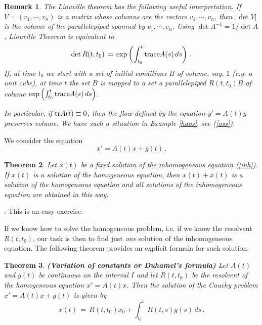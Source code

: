 \documentclass[12pt]{report}
\newcommand{\trace}{{\rm tr}}
\newtheorem{theorem}{Theorem}[section]
\newtheorem{remark}[theorem]{Remark}
\newcommand{\proof}{\noindent {\em Proof:~}}
\def\eqref#1{(\ref{#1})}
\def\qed{\hbox{\hskip 6pt\vrule width6pt height7pt depth1pt
    \hskip1pt}\bigskip}
\begin{document}
\begin{remark}{\rm The Liouville theorem has the following useful 
interpretation.  If $V = (v_1, \cdots, v_n)$ is a matrix whose columns
are the vectors $v_1, \cdots, v_n$, then $|\det V|$ is the volume of
the parallelepiped spanned by $v_1, \cdots, v_n$. Using $\det A^{-1} =
1/\det A$, Liouville Theorem is equivalent to
\begin{equation}
\det R(t,t_0) \,=\, \exp\left( \int_{t_0}^t {\rm trace}A(s) \,ds\right)\,.
\end{equation}
If, at time $t_0$ we start with a set of initial conditions $B$ of
volume, say, $1$ (e.g. a unit cube), at time $t$ the set $B$ is mapped
to a set a parallelepiped $R(t,t_0)B$ of volume $\exp\left(
\int_{t_0}^t {\rm trace}A(s) \,ds\right)$.

In particular, if ${\trace}A(t)\equiv0$, then the flow defined by the
equation $y'=A(t)y$ preserves volume. We have such a situation in
Example \ref{haos}, see \eqref{oss}.  }
\end{remark}

\vspace{5mm}

 We consider the equation
\begin{equation}
x' = A(t)x +g(t)\,. \label{inh}
\end{equation}

\begin{theorem} Let ${\bar x}(t)$ be a fixed solution of the inhomogeneous 
equation \eqref{inh}.  If $x(t)$ is a solution of the homogeneous
equation, then $x(t) + {\bar x}(t)$ is a solution of the homogeneous
equation and all solutions of the inhomogeneous equation are obtained
in this way.
\end{theorem}

\proof: This is an easy exercise. \hfill \qed


If we know how to solve the homogeneous problem, i.e. if we know the
resolvent $R(t,t_0)$, our task is then to find just {\em one} solution
of the inhomogeneous equation. The following theorem provides an explicit
formula for such solution. 

\begin{theorem}{\bf (Variation of constants or Duhamel's formula)} 
Let $A(t)$ and $g(t)$ be continuous on the interval $I$ and let
$R(t,t_0)$ be the resolvent of the homogeneous equation
$x'=A(t)x$. Then the solution of the Cauchy problem $x'=A(t)x + g(t)$
is given by
\begin{equation}
x(t) \,=\, R(t,t_0) x_0 + \int_{t_0}^t R(t,s) g(s) \,ds \,.
\end{equation} 
\end{theorem}
\end{document}
